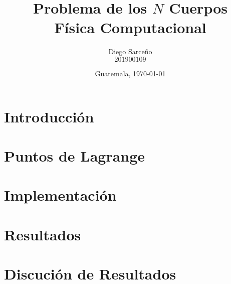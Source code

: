 





\title{\sc Problema de los $N$ Cuerpos \\ \footnotesize{Física Computacional}}%
\author{Diego Sarceño \\ $201900109$}
\date{Guatemala, \today}

  
\maketitle

\begin{abstract}
	\lipsum[1]
\end{abstract}


\section{Introducción}
\label{sec:intro}
\justify 
\lipsum[1]	


\section{Puntos de Lagrange}
\label{sec:Puntos de Lagrange}

\lipsum[1-3]












\section{Implementación}
\label{sec:implementacion}

\lipsum[1]








\section{Resultados}
\label{sec:resultados}

\lipsum[1]


\section{Discución de Resultados}
\label{sec:discucion}

